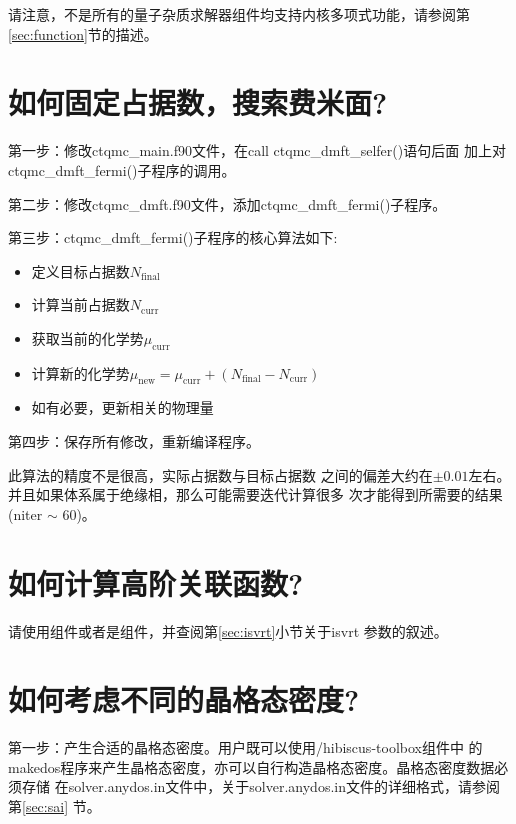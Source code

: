 {请注意，不是所有的量子杂质求解器组件均支持内核多项式功能，请参阅第
\ref{sec:function}节的描述。

\section{如何固定占据数，搜索费米面?}
\label{app:fermi}

第一步：修改ctqmc\_main.f90文件，在call ctqmc\_dmft\_selfer()语句后面
加上对ctqmc\_dmft\_fermi()子程序的调用。

第二步：修改ctqmc\_dmft.f90文件，添加ctqmc\_dmft\_fermi()子程序。

第三步：ctqmc\_dmft\_fermi()子程序的核心算法如下:
\begin{itemize}
\item 定义目标占据数$N_{\text{final}}$

\item 计算当前占据数$N_{\text{curr}}$

\item 获取当前的化学势$\mu_{\text{curr}}$

\item 计算新的化学势$\mu_{\text{new}} = \mu_{\text{curr}} + (N_{\text{final}} - N_{\text{curr}})$

\item 如有必要，更新相关的物理量
\end{itemize}

第四步：保存所有修改，重新编译程序。

此算法的精度不是很高，实际占据数与目标占据数
之间的偏差大约在$\pm 0.01$左右。并且如果体系属于绝缘相，那么可能需要迭代计算很多
次才能得到所需要的结果(niter $\sim$ 60)。

\section{如何计算高阶关联函数?}
\label{app:corr}

请使用{\gardenia}组件或者是{\narcissus}组件，并查阅第\ref{sec:isvrt}小节关于isvrt
参数的叙述。

\section{如何考虑不同的晶格态密度?}
\label{app:dos}

第一步：产生合适的晶格态密度。用户既可以使用{\hibiscus}/hibiscus-toolbox组件中
的makedos程序来产生晶格态密度，亦可以自行构造晶格态密度。晶格态密度数据必须存储
在solver.anydos.in文件中，关于solver.anydos.in文件的详细格式，请参阅第\ref{sec:sai}
节。

}
